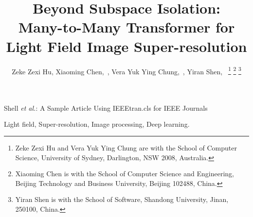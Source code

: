 \documentclass[journal]{IEEEtran}
\begin{document}
\title{Beyond Subspace Isolation: \\ Many-to-Many Transformer for Light Field Image Super-resolution}

\author{Zeke Zexi Hu, Xiaoming Chen,~, Vera Yuk Ying Chung,~, Yiran Shen,~
\thanks{Zeke Zexi Hu and Vera Yuk Ying Chung are with the School of Computer Science, University of Sydney, Darlington, NSW 2008, Australia.}
\thanks{Xiaoming Chen is with the School of Computer Science and Engineering, Beijing Technology and Business University, Beijing 102488, China.}
\thanks{Yiran Shen is with the School of Software, Shandong University, Jinan, 250100, China.}
}

%
{Shell \MakeLowercase{\textit{et al.}}: A Sample Article Using IEEEtran.cls for IEEE Journals}


\maketitle



\begin{IEEEkeywords}
Light field, Super-resolution, Image processing, Deep learning.
\end{IEEEkeywords}









\end{document}

